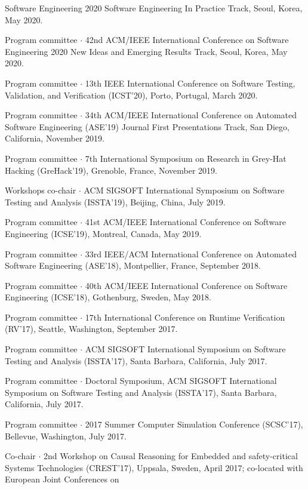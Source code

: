 \documentclass[ComputerScience]{vita}
\begin{document}
\begin{vita}
\begin{Panel and Committee Service}
  Software Engineering 2020 Software Engineering In Practice Track, 
  Seoul, Korea, May 2020.
\item Program committee $\cdot$ 42nd ACM/IEEE International Conference on 
  Software Engineering 2020 New Ideas and Emerging Results Track, 
  Seoul, Korea, May 2020.
\item Program committee $\cdot$ 13th IEEE International Conference on
  Software Testing, Validation, and Verification (ICST'20), Porto,
  Portugal, March 2020.
\item Program committee $\cdot$ 34th ACM/IEEE International Conference on Automated Software Engineering (ASE'19) Journal First Presentations Track, San Diego, California, November 2019.
\item Program committee $\cdot$ 7th International Symposium on
  Research in Grey-Hat Hacking (GreHack'19), Grenoble, France, 
  November 2019. 
\item Workshops co-chair $\cdot$ ACM SIGSOFT International Symposium on Software Testing and Analysis (ISSTA'19), Beijing, China, July 2019.
\item Program committee $\cdot$ 41st ACM/IEEE International Conference on Software Engineering (ICSE'19), Montreal, Canada, May 2019. 
\item Program committee $\cdot$ 33rd IEEE/ACM International Conference on Automated Software Engineering (ASE'18), Montpellier, France, September 2018.
\item Program committee $\cdot$ 40th ACM/IEEE International Conference on Software Engineering (ICSE'18), Gothenburg, Sweden, May 2018. 
\item Program committee $\cdot$ 17th International Conference on Runtime Verification (RV'17), Seattle, Washington, September 2017.
\item Program committee $\cdot$ ACM SIGSOFT International Symposium on Software Testing and Analysis (ISSTA'17), Santa Barbara, California, July 2017.
\item Program committee $\cdot$ Doctoral Symposium, ACM SIGSOFT International Symposium on Software Testing and Analysis (ISSTA'17), Santa Barbara, California, July 2017.
\item Program committee $\cdot$ 2017 Summer Computer Simulation Conference (SCSC'17), Bellevue, Washington, July 2017.
\item Co-chair $\cdot$  2nd Workshop on Causal Reasoning for Embedded
  and safety-critical Systems Technologies (CREST'17), Uppsala,
  Sweden, April 2017; co-located with European Joint Conferences on

\end{Panel and Committee Service}
\end{vita}
\end{document}
